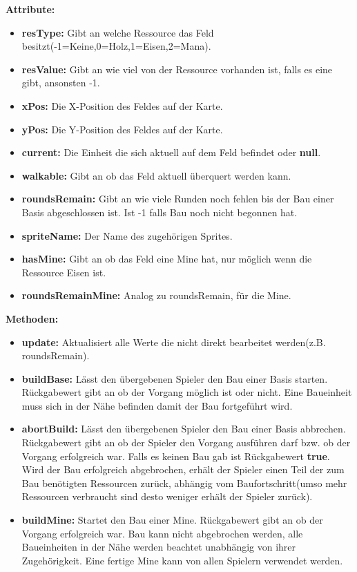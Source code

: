 \documentclass[fontsize=12pt,paper=a4,twoside]{scrartcl}
\begin{document}
\textbf{Attribute:}
\begin{itemize}
\item \textbf{resType:} Gibt an welche Ressource das Feld besitzt(-1=Keine,0=Holz,1=Eisen,2=Mana).
\item \textbf{resValue:} Gibt an wie viel von der Ressource vorhanden ist, falls es eine gibt, ansonsten -1.
\item \textbf{xPos:} Die X-Position des Feldes auf der Karte.
\item \textbf{yPos:} Die Y-Position des Feldes auf der Karte.
\item \textbf{current:} Die Einheit die sich aktuell auf dem Feld befindet oder \textbf{null}.
\item \textbf{walkable:} Gibt an ob das Feld aktuell überquert werden kann.
\item \textbf{roundsRemain:} Gibt an wie viele Runden noch fehlen bis der Bau einer Basis abgeschlossen ist. Ist -1 falls Bau noch nicht begonnen hat.
\item \textbf{spriteName:} Der Name des zugehörigen Sprites.
\item \textbf{hasMine:} Gibt an ob das Feld eine Mine hat, nur möglich wenn die Ressource Eisen ist.
\item \textbf{roundsRemainMine:} Analog zu roundsRemain, für die Mine.
\end{itemize}


\textbf{Methoden:}
\begin{itemize}
\item \textbf{update:} Aktualisiert alle Werte die nicht direkt bearbeitet werden(z.B. roundsRemain).
\item \textbf{buildBase:} Lässt den übergebenen Spieler den Bau einer Basis starten. Rückgabewert gibt an ob der Vorgang möglich ist oder nicht. Eine Baueinheit muss sich in der Nähe befinden damit der Bau fortgeführt wird.
\item \textbf{abortBuild:} Lässt den übergebenen Spieler den Bau einer Basis abbrechen. Rückgabewert gibt an ob der Spieler den Vorgang ausführen darf bzw. ob der Vorgang erfolgreich war. Falls es keinen Bau gab ist Rückgabewert \textbf{true}. Wird der Bau erfolgreich abgebrochen, erhält der Spieler einen Teil der zum Bau benötigten Ressourcen zurück, abhängig vom Baufortschritt(umso mehr Ressourcen verbraucht sind desto weniger erhält der Spieler zurück).
\item \textbf{buildMine:} Startet den Bau einer Mine. Rückgabewert gibt an ob der Vorgang erfolgreich war. Bau kann nicht abgebrochen werden, alle Baueinheiten in der Nähe werden beachtet unabhängig von ihrer Zugehörigkeit. Eine fertige Mine kann von allen Spielern verwendet werden.
\end{itemize}
\end{document}

